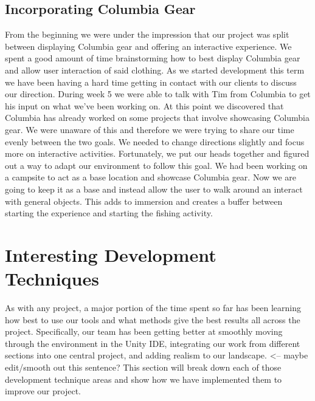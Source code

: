 \documentclass[10pt,journal,compsoc,onecolumn, draftclsnofoot]{IEEEtran}
\begin{document}
\subsection{Incorporating Columbia Gear}
From the beginning we were under the impression that our project was split between displaying Columbia gear and offering an interactive experience.
We spent a good amount of time brainstorming how to best display Columbia gear and allow user interaction of said clothing.
As we started development this term we have been having a hard time getting in contact with our clients to discuss our direction.
During week 5 we were able to talk with Tim from Columbia to get his input on what we’ve been working on.
At this point we discovered that Columbia has already worked on some projects that involve showcasing Columbia gear.
We were unaware of this and therefore we were trying to share our time evenly between the two goals.
We needed to change directions slightly and focus more on interactive activities.
Fortunately, we put our heads together and figured out a way to adapt our environment to follow this goal.
We had been working on a campsite to act as a base location and showcase Columbia gear.
Now we are going to keep it as a base and instead allow the user to walk around an interact with general objects.
This adds to immersion and creates a buffer between starting the experience and starting the fishing activity.


\section{Interesting Development Techniques}
As with any project, a major portion of the time spent so far has been learning how best to use our tools and what methods give the best results all across the project.
Specifically, our team has been getting better at smoothly moving through the environment in the Unity IDE, integrating our work from different sections into one central project, and adding realism to our landscape.  <-- maybe edit/smooth out this sentence?
This section will break down each of those development technique areas and show how we have implemented them to improve our project.
\end{document}
